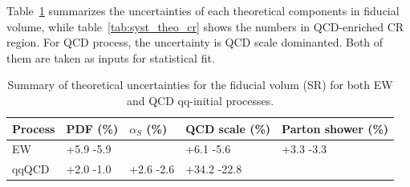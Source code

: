 Table~\ref{tab:syst_theo_sr} summarizes the uncertainties of each theoretical components in fiducial volume,
while table~\ref{tab:syst_theo_cr} shows the numbers in QCD-enriched CR region.
For QCD process, the uncertainty is QCD scale dominanted.
Both of them are taken as inputs for statistical fit.
\begin{table}[!htb]
\small
\begin{center}
\begin{tabular}{lllll} 
\hline\hline
Process     & PDF (\%)  & $\alpha_{S}$ (\%) & QCD scale (\%) & Parton shower (\%) \\
\hline
EW         & +5.9 -5.9 &                   & +6.1 -5.6      & +3.3 -3.3          \\
qqQCD      & +2.0 -1.0 & +2.6 -2.6         & +34.2 -22.8    &                    \\
\hline\hline
\end{tabular}
\caption{
Summary of theoretical uncertainties for the fiducial volum (SR) for both EW and QCD qq-initial processes.
}
\label{tab:syst_theo_sr}
\end{center}
\end{table}

